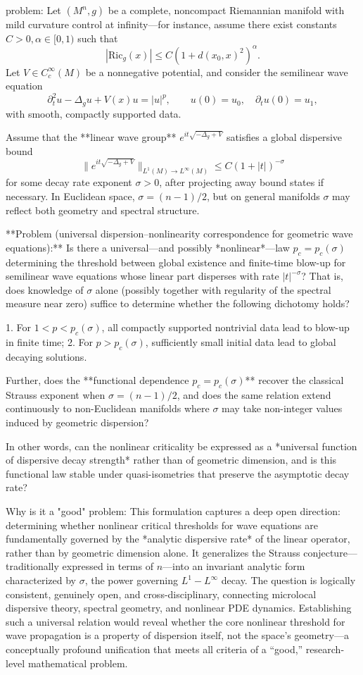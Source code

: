 problem:  
Let \((M^n,g)\) be a complete, noncompact Riemannian manifold with mild curvature control at infinity—for instance, assume there exist constants \(C>0,\alpha\in[0,1)\) such that  
\[
|\mathrm{Ric}_g(x)|\le C(1+d(x_0,x)^2)^\alpha.
\]  
Let \(V\in C_c^\infty(M)\) be a nonnegative potential, and consider the semilinear wave equation  
\[
\partial_t^2u - \Delta_g u + V(x)u = |u|^p,\qquad u(0)=u_0,\quad \partial_t u(0)=u_1,
\]
with smooth, compactly supported data.  

Assume that the **linear wave group** \(e^{it\sqrt{-\Delta_g+V}}\) satisfies a global dispersive bound
\[
\|e^{it\sqrt{-\Delta_g+V}}\|_{L^1(M)\to L^\infty(M)} \le C(1+|t|)^{-\sigma}
\]
for some decay rate exponent \(\sigma>0\), after projecting away bound states if necessary. In Euclidean space, \(\sigma=(n-1)/2\), but on general manifolds \(\sigma\) may reflect both geometry and spectral structure.

**Problem (universal dispersion–nonlinearity correspondence for geometric wave equations):**  
Is there a universal—and possibly *nonlinear*—law \(p_c=p_c(\sigma)\) determining the threshold between global existence and finite-time blow-up for semilinear wave equations whose linear part disperses with rate \(|t|^{-\sigma}\)? That is, does knowledge of \(\sigma\) alone (possibly together with regularity of the spectral measure near zero) suffice to determine whether the following dichotomy holds?

1. For \(1<p<p_c(\sigma)\), all compactly supported nontrivial data lead to blow-up in finite time;  
2. For \(p>p_c(\sigma)\), sufficiently small initial data lead to global decaying solutions.

Further, does the **functional dependence \(p_c=p_c(\sigma)\)** recover the classical Strauss exponent when \(\sigma=(n-1)/2\), and does the same relation extend continuously to non-Euclidean manifolds where \(\sigma\) may take non-integer values induced by geometric dispersion?  

In other words, can the nonlinear criticality be expressed as a *universal function of dispersive decay strength* rather than of geometric dimension, and is this functional law stable under quasi-isometries that preserve the asymptotic decay rate?

Why is it a "good" problem:  
This formulation captures a deep open direction: determining whether nonlinear critical thresholds for wave equations are fundamentally governed by the *analytic dispersive rate* of the linear operator, rather than by geometric dimension alone. It generalizes the Strauss conjecture—traditionally expressed in terms of \(n\)—into an invariant analytic form characterized by \(\sigma\), the power governing \(L^1\!-\!L^\infty\) decay. The question is logically consistent, genuinely open, and cross-disciplinary, connecting microlocal dispersive theory, spectral geometry, and nonlinear PDE dynamics. Establishing such a universal relation would reveal whether the core nonlinear threshold for wave propagation is a property of dispersion itself, not the space’s geometry—a conceptually profound unification that meets all criteria of a “good,” research-level mathematical problem.